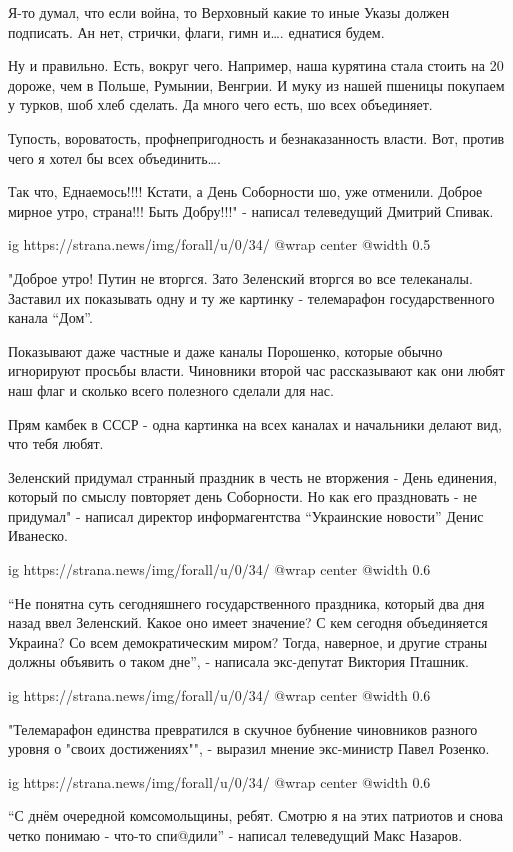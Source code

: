 Я-то думал, что если война, то Верховный какие то иные Указы должен подписать.
Ан нет, стрички, флаги, гимн и…. еднатися будем.

Ну и правильно. Есть, вокруг чего. Например, наша курятина стала стоить на 20%
дороже, чем в Польше, Румынии, Венгрии. И муку из нашей пшеницы покупаем у
турков, шоб хлеб сделать. Да много чего есть, шо всех объединяет. 

Тупость, вороватость, профнепригодность и безнаказанность власти. Вот, против
чего я хотел бы всех объединить….

Так что, Еднаемось!!!! Кстати, а День Соборности шо, уже отменили. Доброе
мирное утро, страна!!! Быть Добру!!!" - написал телеведущий Дмитрий Спивак.

\ifcmt
  ig https://strana.news/img/forall/u/0/34/%
  @wrap center
  @width 0.5
\fi

"Доброе утро! Путин не вторгся. Зато Зеленский вторгся во все телеканалы.
Заставил их показывать одну и ту же картинку - телемарафон государственного
канала \enquote{Дом}.

Показывают даже частные и даже каналы Порошенко, которые обычно игнорируют
просьбы власти. Чиновники второй час рассказывают как они любят наш флаг и
сколько всего полезного сделали для нас.

Прям камбек в СССР - одна картинка на всех каналах и начальники делают вид, что
тебя любят.

Зеленский придумал странный праздник в честь не вторжения - День единения,
который по смыслу повторяет день Соборности. Но как его праздновать - не
придумал" - написал директор информагентства \enquote{Украинские новости} Денис
Иванеско.

\ifcmt
  ig https://strana.news/img/forall/u/0/34/%
  @wrap center
  @width 0.6
\fi

\enquote{Не понятна суть сегодняшнего государственного праздника, который два дня назад
ввел Зеленский. Какое оно имеет значение? С кем сегодня объединяется Украина?
Со всем демократическим миром? Тогда, наверное, и другие страны должны объявить
о таком дне}, - написала экс-депутат Виктория Пташник.

\ifcmt
  ig https://strana.news/img/forall/u/0/34/%
  @wrap center
  @width 0.6
\fi

"Телемарафон единства превратился в скучное бубнение чиновников разного уровня
о "своих достижениях"", - выразил мнение экс-министр Павел Розенко.

\ifcmt
  ig https://strana.news/img/forall/u/0/34/%
  @wrap center
  @width 0.6
\fi

\enquote{С днём очередной комсомольщины, ребят. Смотрю я на этих патриотов и снова
четко понимаю - что-то спи@дили} - написал телеведущий Макс Назаров.

